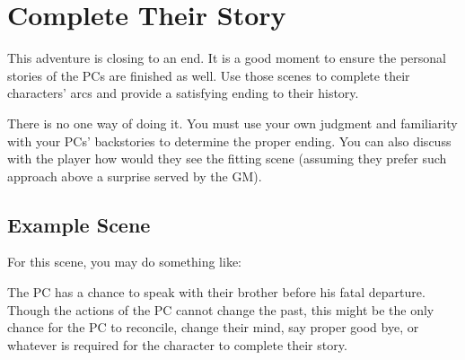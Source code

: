 \section{Complete Their Story}
\label{sec:completeTheirStory}

This adventure is closing to an end. It is a good moment to ensure the personal stories of the PCs are finished as well. Use those scenes to complete their characters' arcs and provide a satisfying ending to their history.

There is no one way of doing it. You must use your own judgment and familiarity with your PCs' backstories to determine the proper ending. You can also discuss with the player how would they see the fitting scene (assuming they prefer such approach above a surprise served by the GM).




\subsection{Example Scene}

For this scene, you may do something like:


The PC has a chance to speak with their brother before his fatal departure. Though the actions of the PC cannot change the past, this might be the only chance for the PC to reconcile, change their mind, say proper good bye, or whatever is required for the character to complete their story.